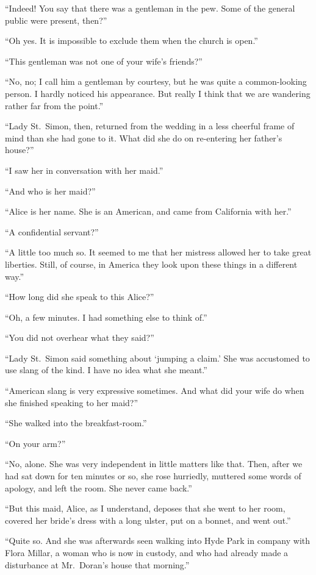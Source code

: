“Indeed! You say that there was a gentleman in the pew.
Some of the general public were present, then?”

“Oh yes. It is impossible to exclude them when the church
is open.”

“This gentleman was not one of your wife’s friends?”

“No, no; I call him a gentleman by courtesy, but he was
quite a common-looking person. I hardly noticed his appearance.
But really I think that we are wandering rather far
from the point.”

“Lady St.~Simon, then, returned from the wedding in a
less cheerful frame of mind than she had gone to it. What
did she do on re-entering her father’s house?”

“I saw her in conversation with her maid.”

“And who is her maid?”

“Alice is her name. She is an American, and came from
California with her.”

“A confidential servant?”

“A little too much so. It seemed to me that her mistress
allowed her to take great liberties. Still, of course, in America
they look upon these things in a different way.”

“How long did she speak to this Alice?”

“Oh, a few minutes. I had something else to think of.”

“You did not overhear what they said?”

“Lady St.~Simon said something about ‘jumping a claim.’
She was accustomed to use slang of the kind. I have no idea
what she meant.”

“American slang is very expressive sometimes. And what
did your wife do when she finished speaking to her maid?”

“She walked into the breakfast-room.”

“On your arm?”

“No, alone. She was very independent in little matters
like that. Then, after we had sat down for ten minutes or
so, she rose hurriedly, muttered some words of apology, and
left the room. She never came back.”

“But this maid, Alice, as I understand, deposes that she
went to her room, covered her bride’s dress with a long ulster,
put on a bonnet, and went out.”

“Quite so. And she was afterwards seen walking into
Hyde Park in company with Flora Millar, a woman who is
now in custody, and who had already made a disturbance at
Mr.~Doran’s house that morning.”

